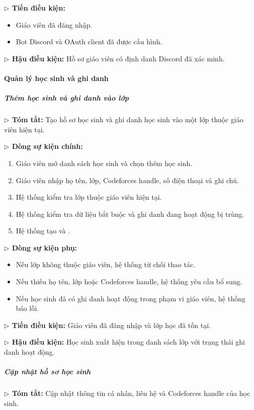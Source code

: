 \documentclass[12pt,a4paper]{article}
\newcommand{\code}[1]{{\ttfamily\seqsplit{#1}}}
\begin{document}
\textbf{$\triangleright$ Tiền điều kiện:}
\begin{itemize}[leftmargin=*]
\item Giáo viên đã đăng nhập.
\item Bot Discord và OAuth client đã được cấu hình.
\end{itemize}

\textbf{$\triangleright$ Hậu điều kiện:} Hồ sơ giáo viên có định danh Discord đã xác minh.

\paragraph{Quản lý học sinh và ghi danh}

\subparagraph{Thêm học sinh và ghi danh vào lớp}
\textbf{$\triangleright$ Tóm tắt:} Tạo hồ sơ học sinh và ghi danh học sinh vào một lớp thuộc giáo viên hiện tại.

\textbf{$\triangleright$ Dòng sự kiện chính:}
\begin{enumerate}[leftmargin=*]
\item Giáo viên mở danh sách học sinh và chọn thêm học sinh.
\item Giáo viên nhập họ tên, lớp, Codeforces handle, số điện thoại và ghi chú.
\item Hệ thống kiểm tra lớp thuộc giáo viên hiện tại.
\item Hệ thống kiểm tra dữ liệu bắt buộc và ghi danh đang hoạt động bị trùng.
\item Hệ thống tạo \code{Student} và \code{Enrollment}.
\end{enumerate}

\textbf{$\triangleright$ Dòng sự kiện phụ:}
\begin{itemize}[leftmargin=*]
\item Nếu lớp không thuộc giáo viên, hệ thống từ chối thao tác.
\item Nếu thiếu họ tên, lớp hoặc Codeforces handle, hệ thống yêu cầu bổ sung.
\item Nếu học sinh đã có ghi danh hoạt động trong phạm vi giáo viên, hệ thống báo lỗi.
\end{itemize}

\textbf{$\triangleright$ Tiền điều kiện:} Giáo viên đã đăng nhập và lớp học đã tồn tại.

\textbf{$\triangleright$ Hậu điều kiện:} Học sinh xuất hiện trong danh sách lớp với trạng thái ghi danh hoạt động.

\subparagraph{Cập nhật hồ sơ học sinh}
\textbf{$\triangleright$ Tóm tắt:} Cập nhật thông tin cá nhân, liên hệ và Codeforces handle của học sinh.
\end{document}
